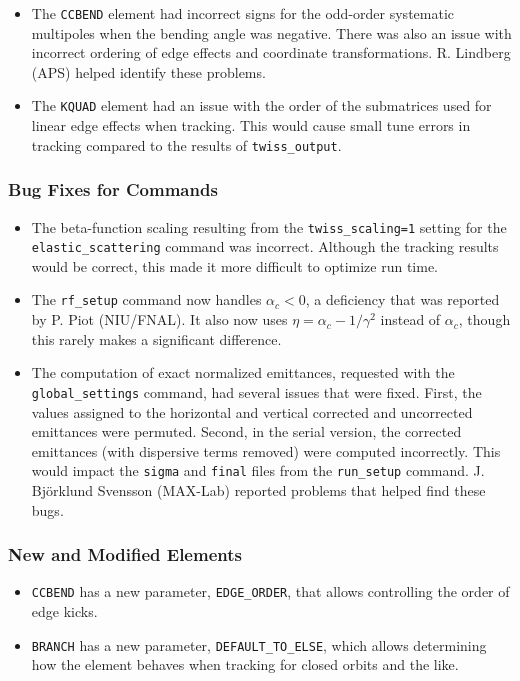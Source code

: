 \documentclass[11pt]{article}
\begin{document}
\begin{itemize}
\item The \verb|CCBEND| element had incorrect signs for the odd-order systematic multipoles when the bending
  angle was negative. There was also an issue with incorrect ordering of edge effects and coordinate transformations.
  R. Lindberg (APS) helped identify these problems.
\item The \verb|KQUAD| element had an issue with the order of the submatrices used for linear edge effects when
  tracking. This would cause small tune errors in tracking compared to the results of \verb|twiss_output|.
\end{itemize}

\subsubsection{Bug Fixes for Commands}
\begin{itemize}
\item The beta-function scaling resulting from the \verb|twiss_scaling=1| setting
  for the \verb|elastic_scattering| command was incorrect. Although the tracking results would be correct,
  this made it more difficult to optimize run time.
\item The \verb|rf_setup| command now handles $\alpha_c<0$, a deficiency that was reported by P. Piot (NIU/FNAL).
  It also now uses $\eta = \alpha_c - 1/\gamma^2$ instead of $\alpha_c$, though this rarely makes a significant
  difference.
\item The computation of exact normalized emittances, requested with the \verb|global_settings| command,
  had several issues that were fixed. First, the values assigned to the horizontal and vertical corrected and
  uncorrected emittances were permuted. Second, in the serial version, the corrected emittances (with dispersive
  terms removed) were computed incorrectly. This would impact the \verb|sigma| and \verb|final| files from
  the \verb|run_setup| command. J. Bj{\"o}rklund Svensson (MAX-Lab) reported problems that helped find these
  bugs.
\end{itemize}

\subsubsection{New and Modified Elements}
\begin{itemize}
\item \verb|CCBEND| has a new parameter, \verb|EDGE_ORDER|, that allows controlling the order of edge kicks.
\item \verb|BRANCH| has a new parameter, \verb|DEFAULT_TO_ELSE|, which allows determining how the element
  behaves when tracking for closed orbits and the like. 
\end{itemize}
\end{document}
